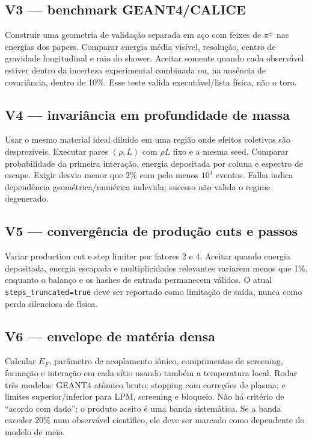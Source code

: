 \documentclass[11pt,a4paper]{article}
\newcommand{\code}[1]{\texttt{#1}}
\begin{document}
\subsection*{V3 --- benchmark GEANT4/CALICE}
Construir uma geometria de validação separada em aço com feixes de $\pi^\pm$
nas energias dos papers. Comparar energia média visível, resolução, centro de
gravidade longitudinal e raio do shower. Aceitar somente quando cada
observável estiver dentro da incerteza experimental combinada ou, na ausência
de covariância, dentro de 10\%. Esse teste valida executável/lista física, não
o toro.

\subsection*{V4 --- invariância em profundidade de massa}
Usar o mesmo material ideal diluído em uma região onde efeitos coletivos são
desprezíveis. Executar pares $(\rho,L)$ com $\rho L$ fixo e a mesma seed.
Comparar probabilidade da primeira interação, energia depositada por coluna e
espectro de escape. Exigir desvio menor que 2\% com pelo menos $10^4$ eventos.
Falha indica dependência geométrica/numérica indevida; sucesso não valida o
regime degenerado.

\subsection*{V5 --- convergência de produção cuts e passos}
Variar production cut e step limiter por fatores 2 e 4. Aceitar quando energia
depositada, energia escapada e multiplicidades relevantes variarem menos que
1\%, enquanto o balanço e os hashes de entrada permanecem válidos. O atual
\code{steps\_truncated=true} deve ser reportado como limitação de saída, nunca
como perda silenciosa de física.

\subsection*{V6 --- envelope de matéria densa}
Calcular $E_F$, parâmetro de acoplamento iônico, comprimentos de screening,
formação e interação em cada sítio usando também a temperatura local. Rodar
três modelos: GEANT4 atômico bruto; stopping com correções de plasma; e
limites superior/inferior para LPM, screening e bloqueio. Não há critério de
``acordo com dado''; o produto aceito é uma banda sistemática. Se a banda
exceder 20\% num observável científico, ele deve ser marcado como dependente
do modelo de meio.
\end{document}
